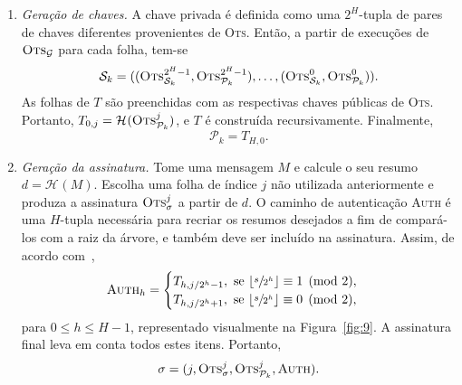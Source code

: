 \documentclass{ufsctex/ufsctex}
\newcommand{\pk}{\mathcal{P}_{k}}
\newcommand{\sk}{\mathcal{S}_{k}}
\newcommand{\hash}[2][]{\mathcal{H}^{#1} (#2)}
\begin{document}
\begin{enumerate}

  \item[] \emph{Geração de chaves.} A chave privada é definida como uma
      $2^{H}$-tupla de pares de chaves diferentes provenientes de \textsc{Ots}.
        Então, a partir de execuções de $\textsc{Ots}_\mathcal{G}$ para cada
        folha, tem-se
        \begin{equation}
          \sk{} = ((\textsc{Ots}_{\sk{}}^{2^{H} - 1},
            \textsc{Ots}_{\pk{}}^{2^{H} - 1}), \dots,
            (\textsc{Ots}_{\sk{}}^{0}, \textsc{Ots}_{\pk{}}^{0})).
        \end{equation}
        As folhas de $T$ são preenchidas com as respectivas chaves públicas de
        \textsc{Ots}. Portanto, $T_{0, j} = \hash{\textsc{Ots}_{\pk{}}^{j}}$, e
        $T$ é construída recursivamente. Finalmente,
        \begin{equation}
          \pk{} = T_{H, 0}.
        \end{equation}

  \item[] \emph{Geração da assinatura.} Tome uma mensagem $M$ e calcule o seu
      resumo $d = \hash{M}$. Escolha uma folha de índice $j$ não utilizada
        anteriormente e produza a assinatura $\textsc{Ots}_\sigma^{j}$ a partir
        de $d$. O caminho de autenticação \textsc{Auth} é uma $H$-tupla
        necessária para recriar os resumos desejados a fim de compará-los com a
        raiz da árvore, e também deve ser incluído na assinatura. Assim, de
        acordo com~\cite[pp. 43]{Bernstein:book:2008},
        \begin{equation}
          \textsc{Auth}_{h} =
          \begin{cases}
            T_{h, j / 2^{h}  - 1}, \text{ se }
              \lfloor \sfrac{s}{2^{h}} \rfloor \equiv 1 \pmod{2}, \\
            T_{h, j / 2^{h}  + 1}, \text{ se }
              \lfloor \sfrac{s}{2^{h}} \rfloor \equiv 0 \pmod{2},
          \end{cases}
        \end{equation}
        para $0 \leq h \leq H - 1$, representado visualmente na
        Figura~\ref{fig:9}. A assinatura final leva em conta todos estes itens.
        Portanto,
        \begin{equation}
          \sigma = (j, \textsc{Ots}_\sigma^{j},
            \textsc{Ots}_{\pk{}}^{j}, \textsc{Auth}).
        \end{equation}


\end{enumerate}
\end{document}
